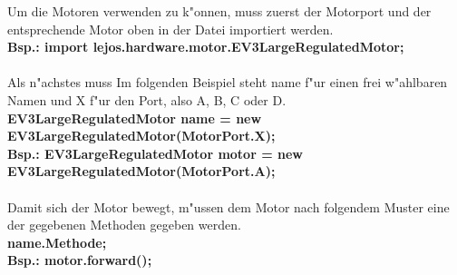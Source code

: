 	Um die Motoren verwenden zu k"onnen, muss zuerst der Motorport und der entsprechende Motor oben in der Datei importiert werden.\\ 
	\textbf{Bsp.: import lejos.hardware.motor.EV3LargeRegulatedMotor;}\\ \\
	Als n"achstes muss 
	Im folgenden Beispiel steht \glqq name\grqq{} f"ur einen frei w"ahlbaren Namen und \glqq X\grqq{} f"ur den Port, also A, B, C oder D.\\
	\textbf{EV3LargeRegulatedMotor name = new EV3LargeRegulatedMotor(MotorPort.X);} \\ 
	\textbf{Bsp.: EV3LargeRegulatedMotor motor = new EV3LargeRegulatedMotor(MotorPort.A);}\\ \\
	Damit sich der Motor bewegt, m"ussen dem Motor nach folgendem Muster eine der gegebenen Methoden gegeben werden.\\
	\textbf{name.Methode;}\\
	\textbf{Bsp.: motor.forward();}

	